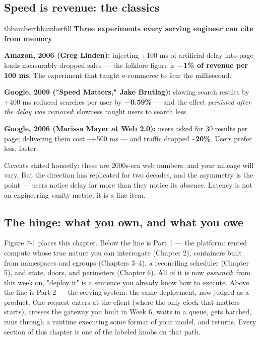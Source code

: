 \subsection*{Speed is revenue: the classics}

\begin{calloutbox}{tbbamber}{tbbamberfill}
{\normalsize\bfseries\color{tbbamberdark}Three experiments every serving engineer can cite from memory}\par\vspace{3pt}
\begin{tbbitemize}
  \item \textbf{Amazon, 2006 (Greg Linden):} injecting +100 ms of artificial delay into page loads measurably dropped sales — the folklore figure is \textbf{−1\% of revenue per 100 ms}. The experiment that taught e-commerce to fear the millisecond.
  \item \textbf{Google, 2009 ("Speed Matters," Jake Brutlag):} slowing search results by +400 ms reduced searches per user by \textbf{−0.59\%} — and the effect \textit{persisted after the delay was removed}: slowness taught users to search less.
  \item \textbf{Google, 2006 (Marissa Mayer at Web 2.0):} users asked for 30 results per page; delivering them cost \textasciitilde{}+500 ms — and traffic dropped \textbf{\textasciitilde{}20\%}. Users prefer less, faster.
\end{tbbitemize}

Caveats stated honestly: these are 2000s-era web numbers, and your mileage will vary. But the direction has replicated for two decades, and the asymmetry is the point — users notice delay far more than they notice its absence. Latency is not an engineering vanity metric; it is a line item.
\end{calloutbox}

\vspace{3.0pt}

\subsection*{The hinge: what you own, and what you owe}

Figure 7-1 places this chapter. Below the line is Part 1 — the platform: rented compute whose true nature you can interrogate (Chapter 2), containers built from namespaces and cgroups (Chapters 3–4), a reconciling scheduler (Chapter 5), and state, doors, and perimeters (Chapter 6). All of it is now \textit{assumed}: from this week on, "deploy it" is a sentence you already know how to execute. Above the line is Part 2 — the serving system: the same deployment, now judged as a product. One request enters at the client (where the only clock that matters starts), crosses the gateway you built in Week 6, waits in a queue, gets batched, runs through a runtime executing some format of your model, and returns. Every section of this chapter is one of the labeled knobs on that path.

